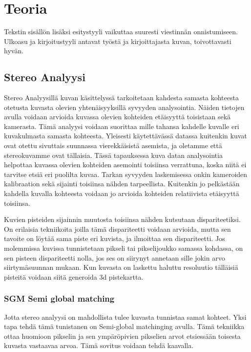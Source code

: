 \chapter{Teoria}%
\label{ch:teoria}

Tekstin sisällön lisäksi esitystyyli vaikuttaa suuresti viestinnän onnistumiseen. Ulkoasu ja kirjoitustyyli antavat työstä ja kirjoittajasta kuvan, toivottavasti hyvän.

\section{Stereo Analyysi}

Stereo Analyysillä kuvan käsittelyssä tarkoitetaan kahdesta samasta kohteesta otetusta kuvasta olevien yhtenäisyyksillä syvyyden analysointia. Näiden tietojen avulla voidaan arvioida kuvassa olevien kohteiden etäisyyttä toisistaan sekä kamerasta. Tämä analyysi voidaan suorittaa mille tahansa kahdelle kuvalle eri kuvakulmasta samasta kohteesta. Yleisesti käytettävässä datassa kuitenkin kuvat ovat otettu sivuttais suunnassa vierekkäisistä asemista, ja oletamme että stereokuvamme ovat tällaisia. Tässä tapauksessa kuva datan analysointia helpottaa kuvassa olevien kohteiden asemointi toisiinsa verrattuna, koska niitä ei tarvitse etsiä eri puolilta kuvaa. Tarkan syvyyden laskemisessa onkin kameroiden kalibraation sekä sijainti toisiinsa nähden tarpeellista. Kuitenkin jo pelkästään kahdella kuvalla kohteesta voidaan jo arvioida kohteiden relatiivista etäisyyttä toisiinsa. 

Kuvien pisteiden sijainnin muutosta toisiinsa nähden kutsutaan dispariteetiksi. On erilaisia tekniikoita joilla tämä dispariteetti voidaan arvioida, mutta sen tavoite on löytää sama piste eri kuvista, ja ilmoittaa sen dispariteetti. Jos molemmissa kuvissa tunnistetaan pikseli tai pikselijoukko samassa kohdassa, on sen pisteen dispariteetti nolla, jos ses on siirynyt annetaan sille jokin arvo siirtymäsuunnan mukaan. Kun kuvasta on laskettu haluttu resoluutio tälläisiä pisteitä voidaan siitä generoida 3d pistekartta.

\subsection{SGM Semi global matching}

Jotta stereo analyysi on mahdollista tulee kuvasta tunnistaa samat kohteet. Yksi tapa tehdä tämä tunistanen on Semi-global matchinging avulla\cite{hirschmuller2005babel}. Tämä tekniikka ottaa huomioon pikselin ja sen ympäröpivien pikselien arvot etsiessään toisesta kuvasta vastaavaa arvoa. Tämä sovitus voidaan tehdä kaavalla.

